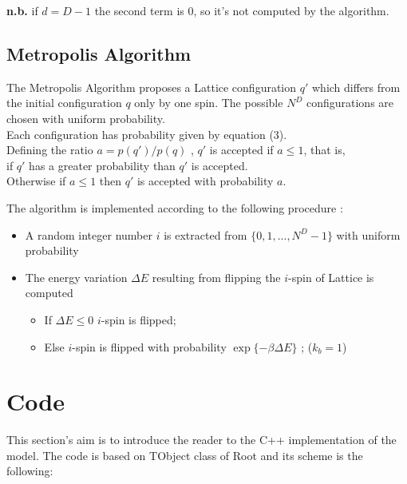 \documentclass[11pt,a4paper]{article}
\begin{document}
\textbf{n.b.} if $d=D-1$ the second term is 0, so it's not computed by the algorithm.

\newpage 

\subsection*{Metropolis Algorithm}

The Metropolis Algorithm proposes a Lattice configuration $q'$ which differs from the initial configuration $q$ only by one spin. The possible $N^D$ configurations are chosen with uniform probability. \\
Each configuration has probability given by equation (3). \\
Defining the ratio $a = p(q')/p(q)$ , $q'$ is accepted if $a \leq 1$, that is, \\ 
if $q'$ has a greater probability than $q'$ is accepted. \\ 
Otherwise if $ a \leq 1 $ then $q'$ is accepted with probability $a$.

The algorithm is implemented according to the following procedure :

\begin{itemize}
	\item[] A random integer number $i$ is extracted from $\{0,1,...,N^D-1\}$ with uniform probability
	\item[] The energy variation $\Delta E$ resulting from flipping the $i$-spin of Lattice is computed     
	\begin{itemize}
		\item[] If $\Delta E \leq 0$ $i$-spin is flipped;\\
		\item[] Else $i$-spin is flipped with probability $\exp \lbrace -\beta \Delta E \rbrace $ ; ($k_b =1$)\\
		
 	\end{itemize}
	
	

\end{itemize}
	
\newpage

\section{Code}
This section's aim is to introduce the reader to the C++ implementation of the model. The code is based on TObject class of Root and its scheme is the following:
\end{document}

